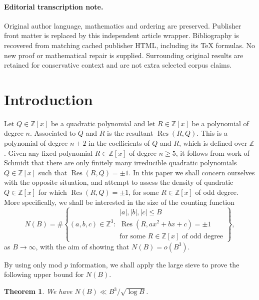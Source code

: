 \documentclass[11pt]{article}
\DeclareMathOperator{\Res}{Res}
\newcommand{\ZZ}{\mathbb{Z}}\let\Z\ZZ
\newtheorem{theorem}{Theorem}[section]
\numberwithin{equation}{section}
\begin{document}
\paragraph{Editorial transcription note.}
Original author language, mathematics and ordering are preserved. Publisher front matter is replaced by this independent article wrapper. Bibliography is recovered from matching cached publisher HTML, including its TeX formulas. No new proof or mathematical repair is supplied. Surrounding original results are retained for conservative context and are not extra selected corpus claims.
\clearpage

\section{Introduction}

Let $Q\in \ZZ[x]$ be a quadratic polynomial
and let $R\in \ZZ[x]$ be a polynomial of degree $n$.
Associated to $Q$ and $R$ is the
resultant $\Res(R,Q)$. This is a polynomial of degree $n+2$ in the coefficients of $Q$ and $R$, which is defined over $\ZZ$.
Given any fixed polynomial $R\in \ZZ[x]$ of degree $n\geq 5$, it follows from work of Schmidt \cite[Th.\,1]{Schmidt} that there are only finitely many irreducible quadratic polynomials $Q\in \ZZ[x]$ such that $\Res(R,Q)=\pm 1$.
In this paper we shall concern ourselves with the
opposite situation, and attempt to assess the
density of quadratic $Q\in \ZZ[x]$
for which
$\Res(R,Q)=\pm 1$, for some $R\in \ZZ[x]$ of odd degree.
More specifically, we shall be interested in the size of the counting function
\begin{equation}\label{eq:NB'}
N(B)=\#\left\{(a,b,c)\in \ZZ^3:
\begin{array}{l}
|a|,|b|,|c|\leq B\\
\Res(R,ax^2+bx+c)=\pm 1\\
\text{for some $R\in \ZZ[x]$ of odd degree}
\end{array}
\right\}\!,
\end{equation}
as $B\to \infty$, with the aim of showing that $N(B)=o(B^3)$.

By using only mod $p$ information, we shall apply the large sieve to prove the following upper bound for $N(B)$.

\begin{theorem}\label{t:1}
We have
$
N(B)\ll B^3/\sqrt{\log B}$.
\end{theorem}
\end{document}
